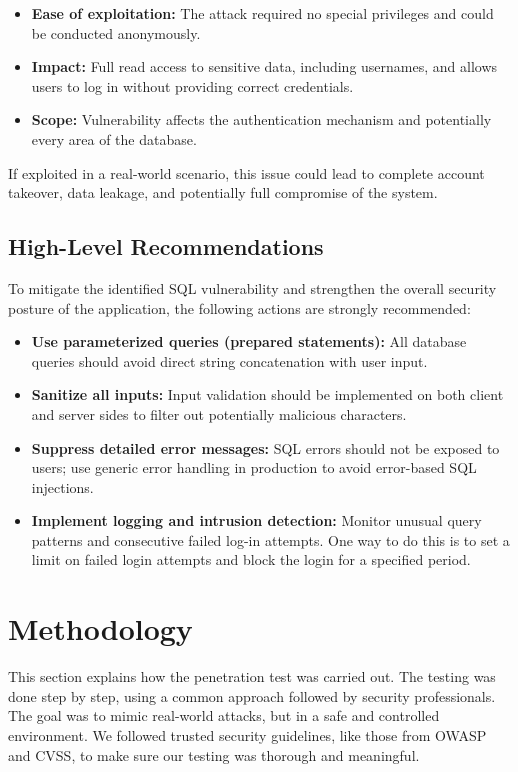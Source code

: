 \documentclass[12pt]{article}
\begin{document}
\begin{itemize}
  \item \textbf{Ease of exploitation:} The attack required no special privileges and could be conducted anonymously.
  \item \textbf{Impact:} Full read access to sensitive data, including usernames, and allows users to log in without providing correct credentials.
  \item \textbf{Scope:} Vulnerability affects the authentication mechanism and potentially every area of the database.
\end{itemize}

If exploited in a real-world scenario, this issue could lead to complete account takeover, data leakage, and potentially full compromise of the system.

\subsection{High-Level Recommendations}
To mitigate the identified SQL vulnerability and strengthen the overall security posture of the application, the following actions are strongly recommended:

\begin{itemize}
  \item \textbf{Use parameterized queries (prepared statements):} All database queries should avoid direct string concatenation with user input\cite{owasp-sql-injection}.
  \item \textbf{Sanitize all inputs:} Input validation should be implemented on both client and server sides to filter out potentially malicious characters.
  \item \textbf{Suppress detailed error messages:} SQL errors should not be exposed to users; use generic error handling in production to avoid error-based SQL injections.

  \item \textbf{Implement logging and intrusion detection:} Monitor unusual query patterns and consecutive failed log-in attempts. One way to do this is to set a limit on failed login attempts and block the login for a specified period.
\end{itemize}


\section{Methodology}

This section explains how the penetration test was carried out. The testing was done step by step, using a common approach followed by security professionals. The goal was to mimic real-world attacks, but in a safe and controlled environment. We followed trusted security guidelines, like those from OWASP\cite{owasp-php} and CVSS\cite{cvss-calculator}, to make sure our testing was thorough and meaningful.
\end{document}
